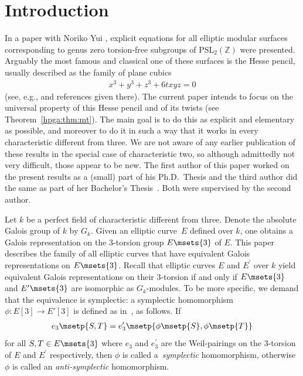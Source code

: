 \section{Introduction}

In a paper with Noriko Yui \cite{TY2007}, explicit equations for all elliptic modular surfaces corresponding to genus zero torsion-free subgroups of $\mbox{PSL}_2({\mathbb Z})$ were presented. Arguably the most famous and classical one of these surfaces is the Hesse pencil, usually described as the family of plane cubics
\begin{gather*}
x^3+y^3+z^3+6txyz=0
\end{gather*}
(see, e.g., \cite[Table~2]{TY2007} and references given there). The current paper intends to focus on the universal property of this Hesse pencil and of its twists (see Theorem~\ref{hpga:thm:mt}). The main goal is to do this as explicit and elementary as possible, and moreover to do it in such a way that it works in every characteristic different from three. We are not aware of any earlier publication of these results in the special case of characteristic two, so although admittedly not very difficult, those appear to be new. The first author of this paper worked on the present results as a (small) part of his Ph.D.~Thesis \cite{ane} and the third author did the same as part of her Bachelor's Thesis~\cite{tuijp2015}. Both were supervised by the second author.

Let $k$ be a perfect field of characteristic different from three. Denote the absolute Galois group of $k$ by $G_k$. Given an elliptic curve~$E$ defined over $k$, one obtains a Galois representation on the 3-torsion group $E \msets{3}$ of $E$. This paper describes the family of all elliptic curves that have equivalent Galois representations on $E\msets{3}$. Recall that elliptic curves $E$ and $E^\prime$ over $k$ yield equivalent Galois representations on their 3-torsion if and only if $E\msets{3}$ and $E^\prime\msets{3}$ are isomorphic as $G_k$-modules. To be more specific, we demand that the equivalence is symplectic: a symplectic homomorphism $\phi\colon E[3]\to E'[3]$ is defined as in~\cite{kuwata2012}, as follows. If
\begin{gather*}
e_3\msetp{S,T}=e^\prime_3\msetp{\phi\msetp{S},\phi\msetp{T}}
\end{gather*}
for all $S,T\in E\msets{3}$ where $e_3$ and $e^\prime_3$ are the Weil-pairings on the 3-torsion of $E$ and $E^\prime$ respectively, then $\phi$ is called a~\emph{symplectic} homomorphism, otherwise~$\phi$ is called an \emph{anti-symplectic} homomorphism.

